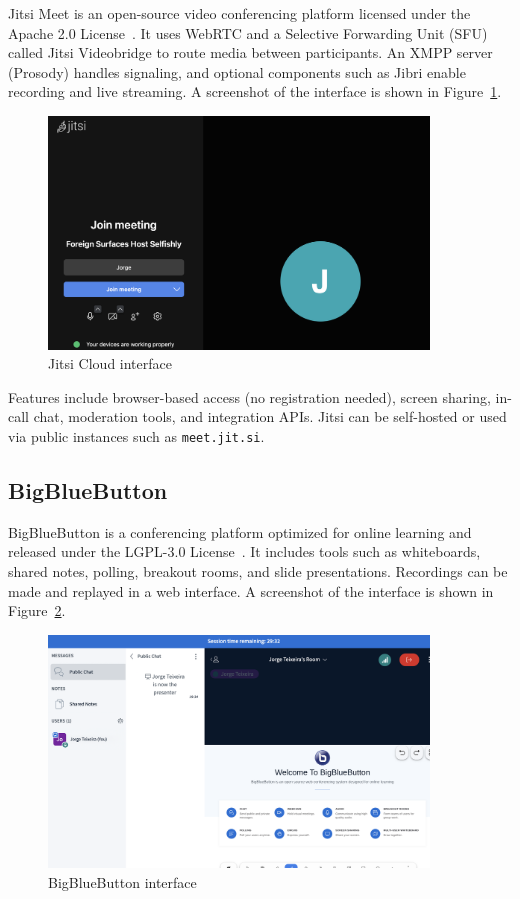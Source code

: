 Jitsi Meet is an open-source video conferencing platform licensed under the Apache 2.0 License~\cite{jitsi-docs}. It uses WebRTC and a Selective Forwarding Unit (SFU) called Jitsi Videobridge to route media between participants. An XMPP server (Prosody) handles signaling, and optional components such as Jibri enable recording and live streaming. A screenshot of the interface is shown in Figure~\ref{fig:jitsi-ui}.

\begin{figure}[H]
  \centering
  \includegraphics[width=0.9\textwidth]{imaxes/jitsi-ui.png}
  \caption{Jitsi Cloud interface}
  \label{fig:jitsi-ui}
\end{figure}

Features include browser-based access (no registration needed), screen sharing, in-call chat, moderation tools, and integration APIs. Jitsi can be self-hosted or used via public instances such as \texttt{meet.jit.si}.

\subsection*{BigBlueButton}

BigBlueButton is a conferencing platform optimized for online learning and released under the LGPL-3.0 License~\cite{bigbluebutton-docs}. It includes tools such as whiteboards, shared notes, polling, breakout rooms, and slide presentations. Recordings can be made and replayed in a web interface. A screenshot of the interface is shown in Figure~\ref{fig:bbb-ui}.

\begin{figure}[H]
  \centering
  \includegraphics[width=0.9\textwidth]{imaxes/bbb-ui.png}
  \caption{BigBlueButton interface}
  \label{fig:bbb-ui}
\end{figure}

